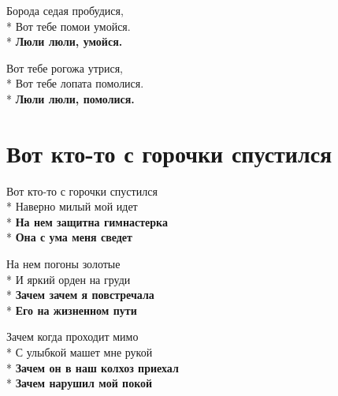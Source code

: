 \medskip

\begin{minipage}{\linewidth}
Борода седая пробудися,\\*
Вот тебе помои умойся.\\*
\textbf{Люли люли, умойся.}\\
\end{minipage}\par\medskip\nobreak

\medskip

\begin{minipage}{\linewidth}
Вот тебе рогожа утрися,\\*
Вот тебе лопата помолися.\\*
\textbf{Люли люли, помолися.}\\
\end{minipage}

\vspace{\fill}\newpage

\section{Вот кто-то с горочки спустился}
\label{song:Вот_кто-то_с_горочки_спустился}

\medskip

\begin{minipage}{\linewidth}
Вот кто-то с горочки спустился\\*
Наверно милый мой идет\\*
\textbf{На нем защитна гимнастерка}\\*
\textbf{Она с ума меня сведет}\\
\end{minipage}\par\medskip\nobreak

\medskip

\begin{minipage}{\linewidth}
На нем погоны золотые\\*
И яркий орден на груди\\*
\textbf{Зачем зачем я повстречала}\\*
\textbf{Его на жизненном пути}\\
\end{minipage}\par\medskip\nobreak

\medskip

\begin{minipage}{\linewidth}
Зачем когда проходит мимо\\*
С улыбкой машет мне рукой\\*
\textbf{Зачем он в наш колхоз приехал}\\*
\textbf{Зачем нарушил мой покой}\\
\end{minipage}\par\medskip\nobreak

